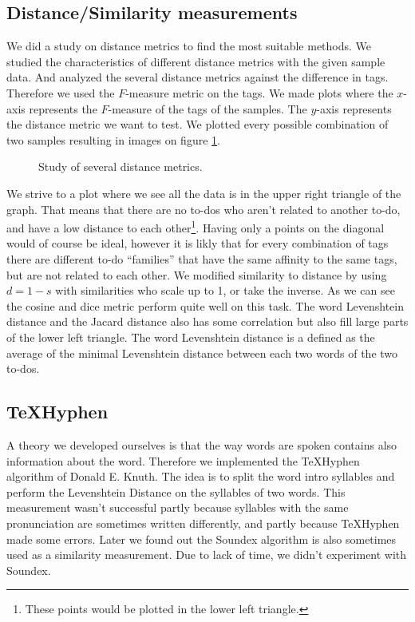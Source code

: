 \documentclass[a4paper,titlepage]{article}
\begin{document}
\subsection{Distance/Similarity measurements}
\label{ss:distanceStudy}
We did a study on distance metrics to find the most suitable methods. We studied the characteristics of different distance metrics with the given sample data. And analyzed the several distance metrics against the difference in tags. Therefore we used the $F$-measure metric on the tags. We made plots where the $x$-axis represents the $F$-measure of the tags of the samples. The $y$-axis represents the distance metric we want to test. We plotted every possible combination of two samples resulting in images on figure \ref{fig:metricStudy}.
\begin{figure}
\centering
{}
\caption{Study of several distance metrics.}
\label{fig:metricStudy}
\end{figure}
We strive to a plot where we see all the data is in the upper right triangle of the graph. That means that there are no to-dos who aren't related to another to-do, and have a low distance to each other\footnote{These points would be plotted in the lower left triangle.}. Having only a points on the diagonal would of course be ideal, however it is likly that for every combination of tags there are different to-do ``families'' that have the same affinity to the same tags, but are not related to each other. We modified similarity to distance by using $d=1-s$ with similarities who scale up to 1, or take the inverse. As we can see the cosine and dice metric perform quite well on this task. The word Levenshtein distance and the Jacard distance also has some correlation but also fill large parts of the lower left triangle. The word Levenshtein distance is a defined as the average of the minimal Levenshtein distance between each two words of the two to-dos.
\subsection{TeXHyphen}
A theory we developed ourselves is that the way words are spoken contains also information about the word. Therefore we implemented the TeXHyphen algorithm\cite[p.376-406]{knuth1986tex} of Donald E. Knuth. The idea is to split the word intro syllables and perform the Levenshtein Distance on the syllables of two words. This measurement wasn't successful partly because syllables with the same pronunciation are sometimes written differently, and partly because TeXHyphen made some errors. Later we found out the Soundex algorithm is also sometimes used as a similarity measurement. Due to lack of time, we didn't experiment with Soundex.
\end{document}
